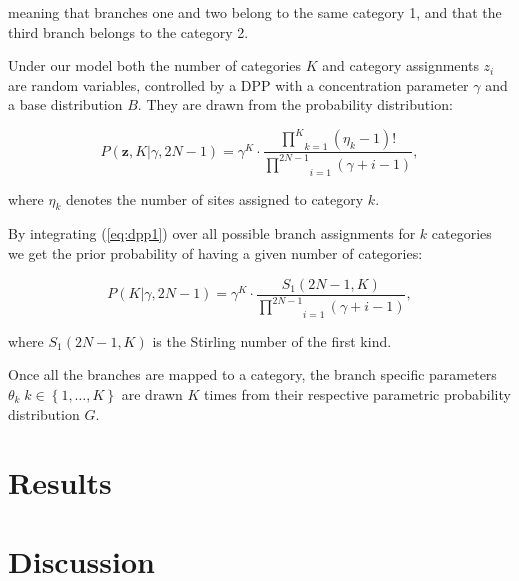\noindent
meaning that branches one and two belong to the same category 1, and that the third branch belongs to the category 2.

Under our model both the number of categories $K$ and category assignments $z_{i}$ are random variables, controlled by a DPP with a concentration parameter $\gamma$ and a base distribution $B$.
They are drawn from the probability distribution:

\begin{equation}
P(\mathbf{z},K|\gamma,2N-1)=\gamma^{K}\cdot\frac{\underset{k=1}{\overset{K}{\prod}}\left(\eta_{k}-1\right)!}{\underset{i=1}{\overset{2N-1}{\prod}}\left(\gamma+i-1\right)},
\label{eq:dpp1} 
\end{equation} 
 
\noindent 
where $\eta_{k}$ denotes the number of sites assigned to category $k$.

By integrating (\ref{eq:dpp1}) over all possible branch assignments for $k$ categories we get the prior probability of having a given number of categories:

\begin{equation}
P(K|\gamma,2N-1)=\gamma^{K}\cdot\frac{S_{1}(2N-1,K)}{\underset{i=1}{\overset{2N-1}{\prod}}\left(\gamma+i-1\right)},
\label{eq:dpp2} 
\end{equation} 

\noindent
where $S_{1}(2N-1,K)$ is the Stirling number of the first kind. 


Once all the branches are mapped to a category, the branch specific parameters $\theta_{k}\; k\in\left\{ 1,\ldots,K\right\}$ are drawn $K$ times from their respective parametric probability distribution $G$.



\section{Results}




\section{Discussion}



